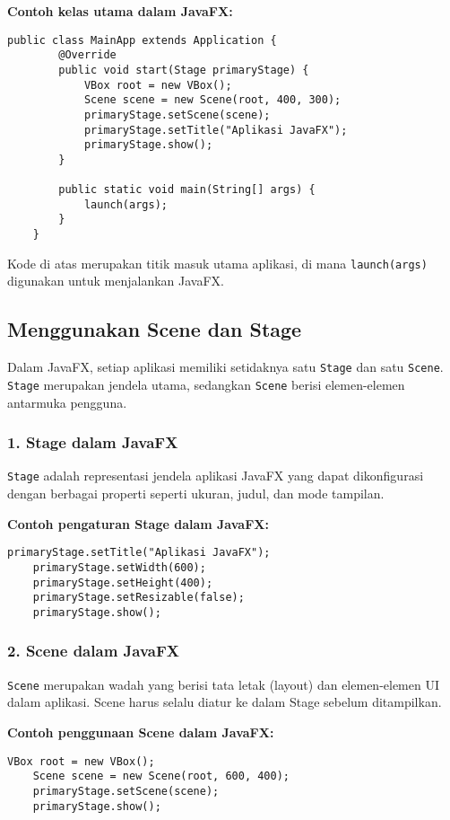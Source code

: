 \textbf{Contoh kelas utama dalam JavaFX:}
\begin{lstlisting}[style=JavaStyle, caption=Kelas utama JavaFX]
	public class MainApp extends Application {
		@Override
		public void start(Stage primaryStage) {
			VBox root = new VBox();
			Scene scene = new Scene(root, 400, 300);
			primaryStage.setScene(scene);
			primaryStage.setTitle("Aplikasi JavaFX");
			primaryStage.show();
		}
		
		public static void main(String[] args) {
			launch(args);
		}
	}
\end{lstlisting}

Kode di atas merupakan titik masuk utama aplikasi, di mana \texttt{launch(args)} digunakan untuk menjalankan JavaFX.

\subsection{Menggunakan Scene dan Stage}

Dalam JavaFX, setiap aplikasi memiliki setidaknya satu \texttt{Stage} dan satu \texttt{Scene}. \texttt{Stage} merupakan jendela utama, sedangkan \texttt{Scene} berisi elemen-elemen antarmuka pengguna.

\subsubsection{1. Stage dalam JavaFX}
\texttt{Stage} adalah representasi jendela aplikasi JavaFX yang dapat dikonfigurasi dengan berbagai properti seperti ukuran, judul, dan mode tampilan.

\textbf{Contoh pengaturan Stage dalam JavaFX:}
\begin{lstlisting}[style=JavaStyle, caption=Mengatur Stage dalam JavaFX]
	primaryStage.setTitle("Aplikasi JavaFX");
	primaryStage.setWidth(600);
	primaryStage.setHeight(400);
	primaryStage.setResizable(false);
	primaryStage.show();
\end{lstlisting}

\subsubsection{2. Scene dalam JavaFX}
\texttt{Scene} merupakan wadah yang berisi tata letak (layout) dan elemen-elemen UI dalam aplikasi. Scene harus selalu diatur ke dalam Stage sebelum ditampilkan.

\textbf{Contoh penggunaan Scene dalam JavaFX:}
\begin{lstlisting}[style=JavaStyle, caption=Membuat Scene dengan layout VBox]
	VBox root = new VBox();
	Scene scene = new Scene(root, 600, 400);
	primaryStage.setScene(scene);
	primaryStage.show();
\end{lstlisting}

